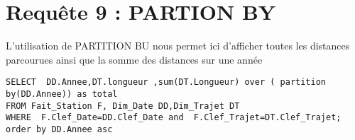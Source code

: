 \section{Requête 9 : PARTION BY }
L'utilisation de PARTITION BU nous permet ici d'afficher toutes les distances parcourues ainsi que la somme des distances sur une année
\begin{verbatim}
SELECT  DD.Annee,DT.longueur ,sum(DT.Longueur) over ( partition by(DD.Annee)) as total
FROM Fait_Station F, Dim_Date DD,Dim_Trajet DT
WHERE  F.Clef_Date=DD.Clef_Date and  F.Clef_Trajet=DT.Clef_Trajet;
order by DD.Annee asc

\end{verbatim}

\clearpage
 
